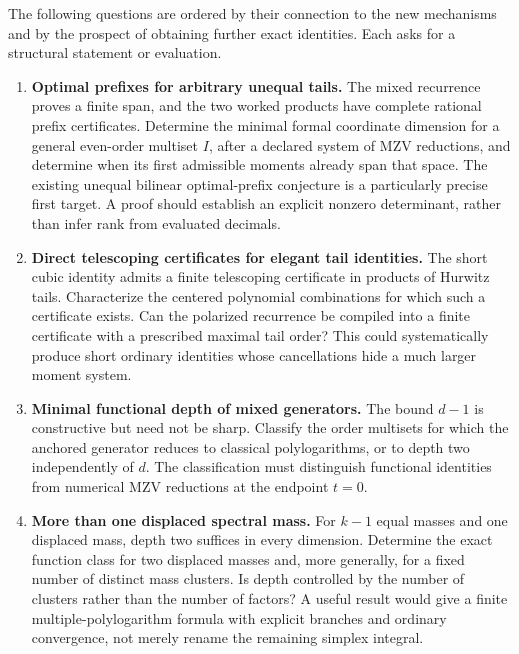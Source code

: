 \documentclass[11pt,letterpaper]{article}
\numberwithin{equation}{section}
\theoremstyle{definition}
\theoremstyle{remark}
\begin{document}
The following questions are ordered by their connection to the
new mechanisms and by the prospect of obtaining further exact
identities. Each asks for a structural statement or evaluation.

\begin{enumerate}[label=\textbf{Q\arabic*.},leftmargin=*]
\item \textbf{Optimal prefixes for arbitrary unequal tails.}
The mixed recurrence proves a finite span, and the two worked
products have complete rational prefix certificates.
Determine the minimal formal coordinate dimension for a
general even-order multiset \(I\), after a declared system of
MZV reductions, and determine when its first admissible
moments already span that space. The existing unequal
bilinear optimal-prefix conjecture is a particularly precise
first target. A proof should establish an explicit nonzero
determinant, rather than infer rank from evaluated decimals.

\item \textbf{Direct telescoping certificates for elegant tail identities.}
The short cubic identity admits a finite telescoping
certificate in products of Hurwitz tails. Characterize the
centered polynomial combinations for which such a certificate
exists. Can the polarized recurrence be compiled into a
finite certificate with a prescribed maximal tail order?
This could systematically produce short ordinary identities
whose cancellations hide a much larger moment system.

\item \textbf{Minimal functional depth of mixed generators.}
The bound \(d-1\) is constructive but need not be sharp.
Classify the order multisets for which the anchored generator
reduces to classical polylogarithms, or to depth two
independently of \(d\). The classification must distinguish
functional identities from numerical MZV reductions at the
endpoint \(t=0\).

\item \textbf{More than one displaced spectral mass.}
For \(k-1\) equal masses and one displaced mass, depth two
suffices in every dimension. Determine the exact function
class for two displaced masses and, more generally, for a
fixed number of distinct mass clusters. Is depth controlled
by the number of clusters rather than the number of factors?
A useful result would give a finite multiple-polylogarithm
formula with explicit branches and ordinary convergence,
not merely rename the remaining simplex integral.


\end{enumerate}
\end{document}
